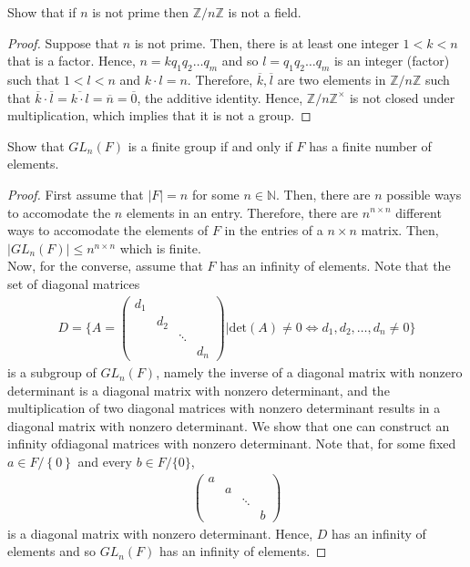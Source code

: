 \documentclass[12pt]{article}
\newcommand{\N}{\mathbb{N}}
\newcommand{\Z}{\mathbb{Z}}
\newenvironment{problem}[2][Problem]{\begin{trivlist} \item[\hskip \labelsep {\bfseries #1}\hskip \labelsep {\bfseries #2.}]}{\end{trivlist}}
\begin{document}
\begin{problem}{4}
  Show that if $n$ is not prime then $\Z/n\Z$ is not a field.
\begin{proof}
  Suppose that $n$ is not prime. Then, there is at least one integer $1<k<n$ that is a factor. Hence, $n=kq_{1}q_{2}\dots q_{m}$ and so $l=q_{1}q_{2}\dots q_{m}$ is an integer (factor) such that $1<l<n$ and $k\cdot l = n$. Therefore, $\overline{k},\overline{l}$ are two elements in $\Z/n\Z$ such that $\overline{k}\cdot\overline{l}=\overline{k\cdot l}=\overline{n} = \overline{0}$, the additive identity. Hence, $\Z/n\Z^{\times}$ is not closed under multiplication, which implies that it is not a group.
\end{proof}
\end{problem}
\begin{problem}{5}
  Show that $GL_{n}(F)$ is a finite group if and only if $F$ has a finite number of elements.
\begin{proof}
  First assume that $|F|=n$ for some $n\in\N$. Then, there are $n$ possible ways to accomodate the $n$ elements in an entry. Therefore, there are $n^{n\times n}$ different ways to accomodate the elements of $F$ in the entries of a $n\times n$ matrix. Then, $|GL_{n}(F)|\leq n^{n\times n}$ which is finite.\\
  Now, for the converse, assume that $F$ has an infinity of elements. Note that the set of diagonal matrices
\begin{align*}
  D = \{ A=\begin{pmatrix} d_{1} \\ & d_{2} \\ & & \ddots \\ & & & d_{n}\end{pmatrix} | \text{det}(A)\neq 0 \iff d_{1},d_{2},\dots,d_{n}\neq 0\}
\end{align*}
is a subgroup of $GL_{n}(F)$, namely the inverse of a diagonal matrix with nonzero determinant is a diagonal matrix with nonzero determinant, and the multiplication of two diagonal matrices with nonzero determinant results in a diagonal matrix with nonzero determinant. We show that one can construct an infinity ofdiagonal matrices with nonzero determinant. Note that, for some fixed $a\in F/\left\{ 0 \right\}$ and every $b\in F/\{0\}$,
\begin{align*} 
\begin{pmatrix}
  a \\ & a\\ & & \ddots \\ & & & b
\end{pmatrix}
\end{align*}
is a diagonal matrix with nonzero determinant. Hence, $D$ has an infinity of elements and so $GL_{n}(F)$ has an infinity of elements.
\end{proof}
\end{problem}
\end{document}
